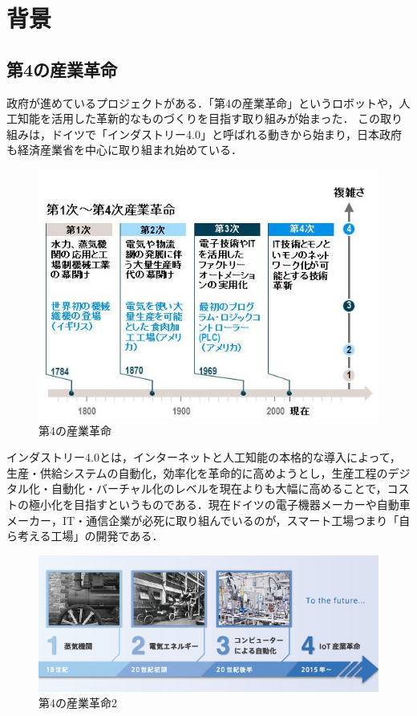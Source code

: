 \chapter{背景}

\section{第4の産業革命}
政府が進めているプロジェクトがある．「第4の産業革命」というロボットや，人工知能を活用した革新的なものづくりを目指す取り組みが始まった\cite{sangyou2014}．
この取り組みは，ドイツで「インダストリー4.0」と呼ばれる動きから始まり，日本政府も経済産業省を中心に取り組まれ始めている．

\begin{figure}[h]
\centering
\includegraphics[width=15cm]{sanngyou.jpg}
\caption{第4の産業革命}\label{図}
\end{figure}

インダストリー4.0とは，インターネットと人工知能の本格的な導入によって，生産・供給システムの自動化，効率化を革命的に高めようとし，生産工程のデジタル化・自動化・バーチャル化のレベルを現在よりも大幅に高めることで，コストの極小化を目指すというものである．現在ドイツの電子機器メーカーや自動車メーカー，IT・通信企業が必死に取り組んでいるのが，スマート工場つまり「自ら考える工場」の開発である\cite{nikkeionline}．

\begin{figure}[h]
\centering
\includegraphics[width=15cm]{005.jpg}
\caption{第4の産業革命2}\label{図}
\end{figure}


